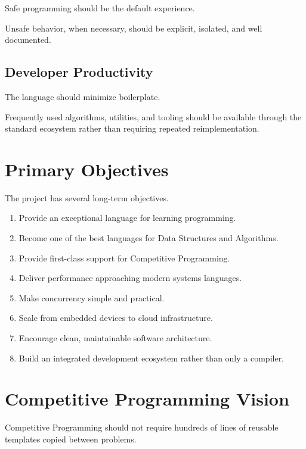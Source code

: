 \documentclass[12pt]{article}
\begin{document}
Safe programming should be the default experience.

Unsafe behavior, when necessary, should be explicit, isolated, and well documented.

\subsection{Developer Productivity}

The language should minimize boilerplate.

Frequently used algorithms, utilities, and tooling should be available through the standard ecosystem rather than requiring repeated reimplementation.


\section{Primary Objectives}

The project has several long-term objectives.

\begin{enumerate}
    \item Provide an exceptional language for learning programming.
    \item Become one of the best languages for Data Structures and Algorithms.
    \item Provide first-class support for Competitive Programming.
    \item Deliver performance approaching modern systems languages.
    \item Make concurrency simple and practical.
    \item Scale from embedded devices to cloud infrastructure.
    \item Encourage clean, maintainable software architecture.
    \item Build an integrated development ecosystem rather than only a compiler.
\end{enumerate}


\section{Competitive Programming Vision}

Competitive Programming should not require hundreds of lines of reusable templates copied between problems.
\end{document}

